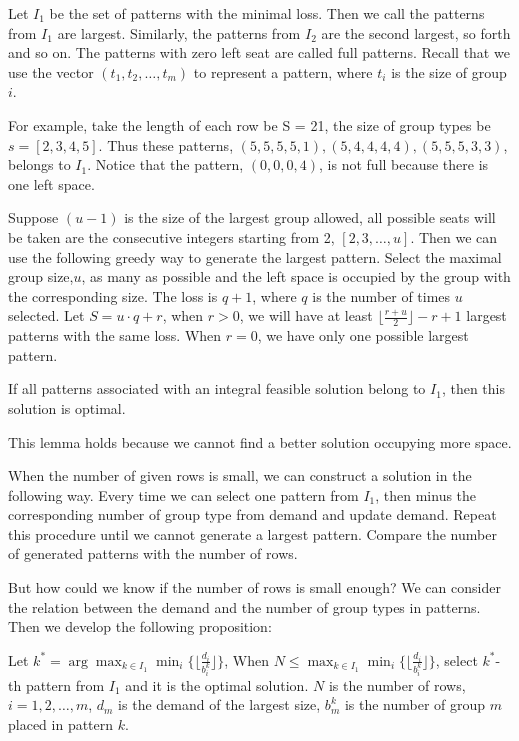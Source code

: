 Let $I_1$ be the set of patterns with the minimal loss. Then we call the patterns from $I_1$ are largest. Similarly, the patterns from $I_2$ are the second largest, so forth and so on. The patterns with zero left seat are called full patterns. Recall that we use the vector $(t_1, t_2, \ldots, t_m)$ to represent a pattern, where $t_i$ is the size of group $i$. 

For example, take the length of each row be S = 21, the size of group types be $s = [2, 3, 4, 5]$. Thus these patterns, $(5, 5, 5, 5, 1),(5, 4, 4, 4, 4),(5, 5, 5, 3, 3)$, belongs to $I_1$. Notice that
the pattern, $(0, 0, 0, 4)$, is not full because there is one left space.

Suppose $(u-1)$ is the size of the largest group allowed, all possible seats will be taken are the consecutive integers starting from 2, $[2,3,\ldots,u]$.
Then we can use the following greedy way to generate the largest pattern. Select the maximal group size,$u$, as many as possible and the left space is occupied by the group with the corresponding size. The loss is $q+1$, where $q$ is the number of times $u$ selected. Let $S = u\cdot q + r$, when $r>0$, we will have at least $\lfloor \frac{r+u}{2} \rfloor -r +1$ largest patterns with the same loss. When $r =0$, we have only one possible largest pattern.

\begin{lem}
If all patterns associated with an integral feasible solution belong to $I_1$, then this solution is optimal.
\end{lem}

This lemma holds because we cannot find a better solution occupying more space.

When the number of given rows is small, we can construct a solution in the following way. Every time we can select one pattern from $I_1$, then minus the corresponding number of group type from demand and update demand. Repeat this procedure until we cannot generate a largest pattern. Compare the number of generated patterns with the number of rows.

But how could we know if the number of rows is small enough?
We can consider the relation between the demand and the number of group types in patterns. Then we develop the following proposition:

\begin{prop}\label{prop_I_1}
  Let $k^{*} = \arg \max_{k\in I_1} \min_{i} \{\lfloor \frac{d_i}{b_i^k}\rfloor\}$, 
  When $N \leq \max_{k\in I_1} \min_{i} \{\lfloor \frac{d_i}{b_i^k}\rfloor\}$, select $k^*$-th pattern from $I_1$ and it is the optimal solution.
  $N$ is the number of rows, $i = 1,2,\ldots, m$, $d_m$ is the demand of the largest size, $b_m^k$ is the number of group $m$ placed in pattern $k$.
\end{prop}

